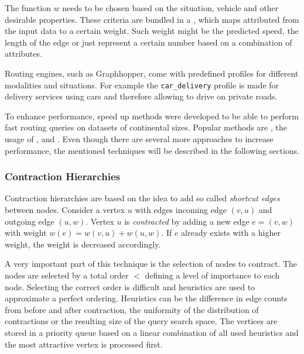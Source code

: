 		The function $w$ needs to be chosen based on the situation, vehicle and other desirable properties.
		These criteria are bundled in a , which maps attributed from the input data to a certain weight.
		Such weight might be the predicted speed\cite{graphhopper-profile-bike-speeds}, the length of the edge\cite{graphhopper-profile-shortest} or just represent a certain number based on a combination of attributes\cite{graphhopper-profile-short-fastest}.
		
		Routing engines, such as Graphhopper, come with predefined profiles for different modalities and situations.
		For example the \texttt{car\_delivery} profile is made for delivery services using cars and therefore allowing to drive on private roads\cite{graphhopper-routing-profiles}.
		
		To enhance performance, speed up methods were developed to be able to perform fast routing queries on datasets of continental sizes.
		Popular methods are , the usage of ,  and .
		Even though there are several more approaches to increase performance, the mentioned techniques will be described in the following sections.
		
		\subsubsection{Contraction Hierarchies}
		
			Contraction hierarchies are based on the idea to add so called \emph{shortcut edges} between nodes\cite{geisberger-contraction-hierarchies}.
			Consider a vertex $u$ with edges incoming edge $(v, u)$ and outgoing edge $(u, w)$.
			Vertex $u$ is \emph{contracted} by adding a new edge $e = (v, w)$ with weight $w(e) = w(v, u) + w(u, w)$.
			If $e$ already exists with a higher weight, the weight is decreased accordingly.
			
			A very important part of this technique is the selection of nodes to contract\cite[14]{geisberger-contraction-hierarchies}.
			The nodes are selected by a total order $<$ defining a level of importance to each node.
			Selecting the correct order is difficult and heuristics are used to approximate a perfect ordering.
			Heuristics can be the difference in edge counts from before and after contraction, the uniformity of the distribution of contractions or the resulting size of the query search space.
			The vertices are stored in a priority queue based on a linear combination of all used heuristics and the most attractive vertex is processed first.
		
